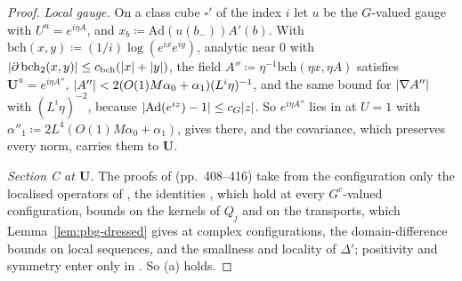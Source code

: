 \documentclass[11pt]{preprint}
\DeclarePairedDelimiter{\abs}{\lvert}{\rvert}
\numberwithin{equation}{section}
\theoremstyle{definition}
\theoremstyle{remark}
\theoremstyle{plain}
\begin{document}
\begin{proof}
\emph{Local gauge.} On a class cube $\square'$ of the index $i$ let $u$ be the $G$-valued gauge with $U^u = e^{i\eta A}$, and $x_b \coloneqq \mathrm{Ad}(u(b_-))A'(b)$. With $\mathrm{bch}(x, y) \coloneqq (1/i)\log(e^{ix}e^{iy})$, analytic near $0$ with $\abs{\partial\,\mathrm{bch}_2(x, y)} \leq c_{\mathrm{bch}}(\abs x + \abs y)$, the field $A'' \coloneqq \eta^{-1}\mathrm{bch}(\eta x, \eta A)$ satisfies $\mathbf U^u = e^{i\eta A''}$, $\abs{A''} < 2(O(1)M\alpha_0 + \alpha_1)(L^i\eta)^{-1}$, and the same bound for $\abs{\nabla A''}$ with $(L^i\eta)^{-2}$, because $\abs{\mathrm{Ad}(e^{iz}) - 1} \leq c_G\abs z$. So $e^{i\eta A''}$ lies in \cite[(3.37)]{BalabanPBG} at $U = 1$ with $\alpha''_1 \coloneqq 2L^4(O(1)M\alpha_0 + \alpha_1)$, \cite[Corollary~3.5]{BalabanPBG} gives \cite[Theorems~3.1--3.3]{BalabanPBG} there, and the covariance, which preserves every norm, carries them to $\mathbf U$.

\emph{Section C at $\mathbf U$.} The proofs of \cite[Theorems~3.7--3.10, Corollary~3.8]{BalabanPBG} (pp.~408--416) take from the configuration only the localised operators of \cite[Corollary~3.6]{BalabanPBG}, the identities \cite[(3.88), (3.95), (3.101)--(3.105)]{BalabanPBG}, which hold at every $G^c$-valued configuration, bounds on the kernels of $Q_j$ and on the transports, which Lemma~\ref{lem:pbg-dressed} gives at complex configurations, the domain-difference bounds on local sequences, and the smallness and locality of $\Delta'$; positivity and symmetry enter only in \cite[Theorem~3.11]{BalabanPBG}. So (a) holds.


\end{proof}
\end{document}
